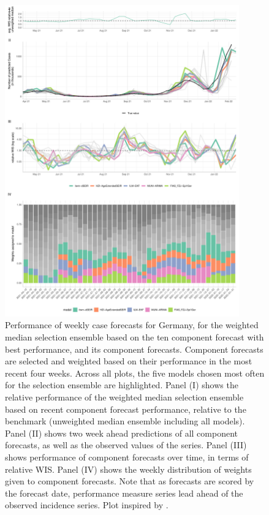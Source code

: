 \begin{figure}
\centering
\includegraphics[width = 0.9\textwidth]{../plots/best_performers_weights_de}
\caption{\footnotesize{Performance of weekly case forecasts for Germany, for the weighted median selection ensemble based on the ten component forecast with best performance, and its component forecasts. Component forecasts are selected and weighted based on their performance in the most recent four weeks. Across all plots, the five models chosen most often for the selection ensemble are highlighted. Panel (I) shows the relative performance of the weighted median selection ensemble based on recent component forecast performance, relative to the benchmark (unweighted median ensemble including all models). Panel (II) shows two week ahead predictions of all component forecasts, as well as the observed values of the series. Panel (III) shows performance of component forecasts over time, in terms of relative WIS. Panel (IV) shows the weekly distribution of weights given to component forecasts. Note that as forecasts are scored by the forecast date, performance measure series lead ahead of the observed incidence series. Plot inspired by \cite{ray_comparing_2022}.}}
\label{fig:bpweights_de}
\end{figure}
